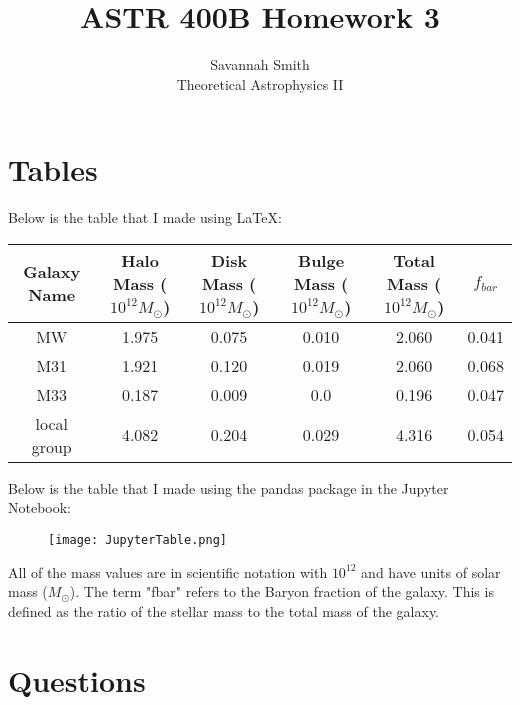 \documentclass[12pt]{article}
\begin{document}
 
 
\title{ASTR 400B Homework 3}
\author{Savannah Smith\\ 
Theoretical Astrophysics II}

\maketitle

\noindent 

\section{Tables}

\noindent Below is the table that I made using LaTeX:

\begin{center}
\scriptsize
\begin{tabular}{||c c c c c c||} 
 \hline
 Galaxy Name & Halo Mass ($10^{12}$$M_{\odot}$) & Disk Mass ($10^{12}$$M_{\odot}$) & Bulge Mass ($10^{12}$$M_{\odot}$) & Total Mass ($10^{12}$$M_{\odot}$) & $f_{bar}$ \\ [0.5ex] 
 \hline\hline
 MW & 1.975 & 0.075 & 0.010 & 2.060 & 0.041 \\ 
 \hline
 M31 & 1.921 & 0.120 & 0.019 & 2.060 & 0.068 \\
 \hline
 M33 & 0.187 & 0.009 & 0.0 & 0.196 & 0.047 \\
 \hline
 local group & 4.082 & 0.204 & 0.029 & 4.316 & 0.054 \\ [1ex] 
 \hline
\end{tabular}
\end{center}

\noindent Below is the table that I made using the pandas package in the Jupyter Notebook:

\begin{figure}[h!]
    \centering
    \texttt{[image: JupyterTable.png]}
\end{figure}

\noindent All of the mass values are in scientific notation with $10^{12}$ and have units of solar mass ($M_{\odot}$). The term "fbar" refers to the Baryon fraction of the galaxy. This is defined as the ratio of the stellar mass to the total mass of the galaxy.

\section{Questions}
\end{document}

